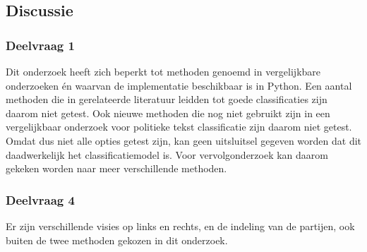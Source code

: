 \subsection{Discussie}
\subsubsection{Deelvraag 1}
Dit onderzoek heeft zich beperkt tot methoden genoemd in vergelijkbare onderzoeken én waarvan de implementatie beschikbaar is in Python. Een aantal methoden die in gerelateerde literatuur leidden tot goede classificaties zijn daarom niet getest. Ook nieuwe methoden die nog niet gebruikt zijn in een vergelijkbaar onderzoek voor politieke tekst classificatie zijn daarom niet getest. Omdat dus niet alle opties getest zijn, kan geen uitsluitsel gegeven worden dat dit daadwerkelijk het classificatiemodel is. Voor vervolgonderzoek kan daarom gekeken worden naar meer verschillende methoden.\par



\subsubsection{Deelvraag 4}
Er zijn verschillende visies op links en rechts, en de indeling van de partijen, ook buiten de twee methoden gekozen in dit onderzoek.\par